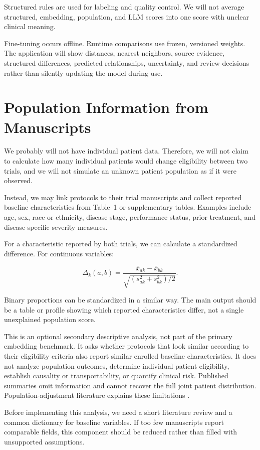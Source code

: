 \documentclass[11pt]{article}
\begin{document}
Structured rules are used for labeling and quality control. We will not average structured, embedding, population, and LLM scores into one score with unclear clinical meaning.

Fine-tuning occurs offline. Runtime comparisons use frozen, versioned weights. The application will show distances, nearest neighbors, source evidence, structured differences, predicted relationships, uncertainty, and review decisions rather than silently updating the model during use.

\section{Population Information from Manuscripts}

We probably will not have individual patient data. Therefore, we will not claim to calculate how many individual patients would change eligibility between two trials, and we will not simulate an unknown patient population as if it were observed.

Instead, we may link protocols to their trial manuscripts and collect reported baseline characteristics from Table~1 or supplementary tables. Examples include age, sex, race or ethnicity, disease stage, performance status, prior treatment, and disease-specific severity measures.

For a characteristic reported by both trials, we can calculate a standardized difference. For continuous variables:

\[
\Delta_k(a,b)=
\frac{\bar{x}_{ak}-\bar{x}_{bk}}
{\sqrt{(s_{ak}^2+s_{bk}^2)/2}}.
\]

Binary proportions can be standardized in a similar way. The main output should be a table or profile showing which reported characteristics differ, not a single unexplained population score.

This is an optional secondary descriptive analysis, not part of the primary embedding benchmark. It asks whether protocols that look similar according to their eligibility criteria also report similar enrolled baseline characteristics. It does not analyze population outcomes, determine individual patient eligibility, establish causality or transportability, or quantify clinical risk. Published summaries omit information and cannot recover the full joint patient distribution. Population-adjustment literature explains these limitations \cite{signorovitch,phillippo}.

Before implementing this analysis, we need a short literature review and a common dictionary for baseline variables. If too few manuscripts report comparable fields, this component should be reduced rather than filled with unsupported assumptions.
\end{document}

